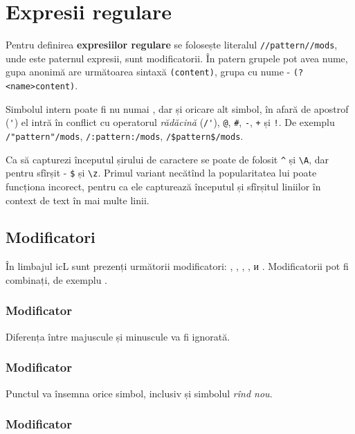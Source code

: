 \section{Expresii regulare}
\label{regex}

Pentru definirea {\bf expresiilor regulare} se folosește literalul \lstinline|//pattern//mods|, unde  este paternul expresii,  sunt modificatorii. În patern grupele pot avea nume, gupa anonimă are următoarea sintaxă \lstinline|(content)|, grupa cu nume - \lstinline|(?<name>content)|.

Simbolul intern poate fi nu numai \code{/}, dar și oricare alt simbol, în afară de apostrof (\lstinline|'|) el intră în conflict cu operatorul {\it rădăcină} (\lstinline|/'|), \lstinline|@|, \lstinline|#|, \lstinline|-|, \lstinline|+| și \lstinline|!|. De exemplu  \lstinline|/"pattern"/mods|, \lstinline|/:pattern:/mods|, \lstinline|/$pattern$/mods|.

Ca să capturezi începutul șirului de caractere se poate de folosit \lstinline|^| și \lstinline|\A|, dar pentru sfîrșit - \lstinline|$| și \lstinline|\z|. Primul variant necătînd la popularitatea lui poate funcționa incorect, pentru ca ele capturează începutul și sfîrșitul liniilor în context de text în mai multe linii.

\subsection{Modificatori}

În limbajul icL sunt prezenți următorii modificatori: , , , ,  и . Modificatorii pot fi combinați, de exemplu .

\subsubsection{Modificator }

Diferența între majuscule și minuscule va fi ignorată. 

\subsubsection{Modificator }

Punctul va însemna orice simbol, inclusiv și simbolul {\it rînd nou}.

\subsubsection{Modificator }


